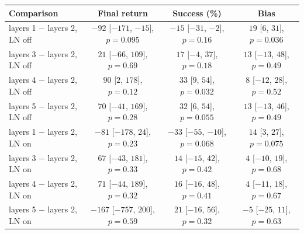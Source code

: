\begin{tabular}{@{}lccc@{}}
\toprule
Comparison & Final return & Success (\%) & Bias \\
\midrule
layers 1 $-$ layers 2, LN off & $-92$ {\scriptsize[$-171$, $-15$]}, $p=0.095$ & $-15$ {\scriptsize[$-31$, $-2$]}, $p=0.16$ & $19$ {\scriptsize[$6$, $31$]}, $p=0.036$ \\
layers 3 $-$ layers 2, LN off & $21$ {\scriptsize[$-66$, $109$]}, $p=0.69$ & $17$ {\scriptsize[$-4$, $37$]}, $p=0.18$ & $13$ {\scriptsize[$-13$, $48$]}, $p=0.49$ \\
layers 4 $-$ layers 2, LN off & $90$ {\scriptsize[$2$, $178$]}, $p=0.12$ & $33$ {\scriptsize[$9$, $54$]}, $p=0.032$ & $8$ {\scriptsize[$-12$, $28$]}, $p=0.52$ \\
layers 5 $-$ layers 2, LN off & $70$ {\scriptsize[$-41$, $169$]}, $p=0.28$ & $32$ {\scriptsize[$6$, $54$]}, $p=0.055$ & $13$ {\scriptsize[$-13$, $46$]}, $p=0.49$ \\
layers 1 $-$ layers 2, LN on & $-81$ {\scriptsize[$-178$, $24$]}, $p=0.23$ & $-33$ {\scriptsize[$-55$, $-10$]}, $p=0.068$ & $14$ {\scriptsize[$3$, $27$]}, $p=0.075$ \\
layers 3 $-$ layers 2, LN on & $67$ {\scriptsize[$-43$, $181$]}, $p=0.33$ & $14$ {\scriptsize[$-15$, $42$]}, $p=0.42$ & $4$ {\scriptsize[$-10$, $19$]}, $p=0.68$ \\
layers 4 $-$ layers 2, LN on & $71$ {\scriptsize[$-44$, $189$]}, $p=0.32$ & $16$ {\scriptsize[$-16$, $48$]}, $p=0.41$ & $4$ {\scriptsize[$-11$, $18$]}, $p=0.67$ \\
layers 5 $-$ layers 2, LN on & $-167$ {\scriptsize[$-757$, $200$]}, $p=0.59$ & $21$ {\scriptsize[$-16$, $56$]}, $p=0.32$ & $-5$ {\scriptsize[$-25$, $11$]}, $p=0.63$ \\
\bottomrule
\end{tabular}
